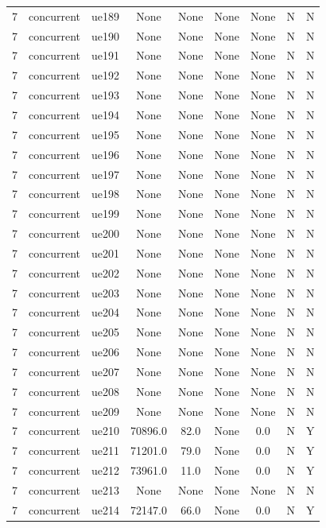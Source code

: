 \begin{table}[ht]
\begin{tabular}{|c|c|c|c|c|c|c|c|c|}
7 & concurrent & ue189 & None & None & None & None & N & N \\
7 & concurrent & ue190 & None & None & None & None & N & N \\
7 & concurrent & ue191 & None & None & None & None & N & N \\
7 & concurrent & ue192 & None & None & None & None & N & N \\
7 & concurrent & ue193 & None & None & None & None & N & N \\
7 & concurrent & ue194 & None & None & None & None & N & N \\
7 & concurrent & ue195 & None & None & None & None & N & N \\
7 & concurrent & ue196 & None & None & None & None & N & N \\
7 & concurrent & ue197 & None & None & None & None & N & N \\
7 & concurrent & ue198 & None & None & None & None & N & N \\
7 & concurrent & ue199 & None & None & None & None & N & N \\
7 & concurrent & ue200 & None & None & None & None & N & N \\
7 & concurrent & ue201 & None & None & None & None & N & N \\
7 & concurrent & ue202 & None & None & None & None & N & N \\
7 & concurrent & ue203 & None & None & None & None & N & N \\
7 & concurrent & ue204 & None & None & None & None & N & N \\
7 & concurrent & ue205 & None & None & None & None & N & N \\
7 & concurrent & ue206 & None & None & None & None & N & N \\
7 & concurrent & ue207 & None & None & None & None & N & N \\
7 & concurrent & ue208 & None & None & None & None & N & N \\
7 & concurrent & ue209 & None & None & None & None & N & N \\
7 & concurrent & ue210 & 70896.0 & 82.0 & None & 0.0 & N & Y \\
7 & concurrent & ue211 & 71201.0 & 79.0 & None & 0.0 & N & Y \\
7 & concurrent & ue212 & 73961.0 & 11.0 & None & 0.0 & N & Y \\
7 & concurrent & ue213 & None & None & None & None & N & N \\
7 & concurrent & ue214 & 72147.0 & 66.0 & None & 0.0 & N & Y \\

\end{tabular}
\end{table}

